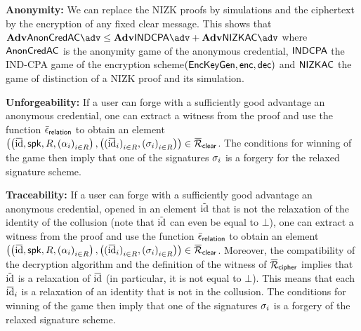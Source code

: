 \begin{compactitem} 
\item \textbf{Anonymity:} We can replace the NIZK 
proofs by simulations and the ciphertext by the encryption of any
	fixed clear message. This shows that
	$\Adv{\ProbAnomCredAC}{\adv} \leq \Adv{\ProbCPAEnc}{\adv} + 
\Adv{\ProbNIZKAC}{\adv}$
	where $\mathsf{AnonCredAC}$ is the anonymity game of the anonymous 
credential, $\textsf{INDCPA}$ the
	IND-CPA game of the encryption scheme\newline $(\mathsf{EncKeyGen}, \textsf{enc}, \textsf{dec})$ 
and $\mathsf{NIZKAC}$ the game of distinction of a NIZK proof and its 
simulation.

\item \textbf{Unforgeability:} If a user can forge with a sufficiently good 
advantage an anonymous
	credential, one can extract a witness from the proof and use the 
function
	$\bar{\epsilon}_{\mathsf{relation}}$ to obtain an element 
$\left(\left(\baridentity, \spk, R, {(\alpha_i)}_{i \in R}\right),
		      \left({(\baridentity_i)}_{i \in R}, 
{(\signature_i)}_{i \in R}\right)\right)
	      \in \barrelationclear$. The conditions for winning of the 
game then imply that one of
	      the signatures $\sigma_i$ is a forgery for the relaxed 
signature scheme.


      \item \textbf{Traceability:} If a user can forge with a sufficiently good 
advantage an anonymous credential, opened in an element 
$\tilde{\text{id}}$ that is not the relaxation of the identity of the 
collusion (note that $\tilde{\text{id}}$ can even be equal to 
$\bot$), one can extract a witness from the proof and use
the function
	$\bar{\epsilon}_{\mathsf{relation}}$ to obtain an element 
$\left(\left(\baridentity, \spk, R, {(\alpha_i)}_{i \in R}\right),
		      \left({(\baridentity_i)}_{i \in R}, 
{(\signature_i)}_{i \in R}\right)\right)
	      \in \barrelationclear$.  Moreover, the compatibility of 
the decryption algorithm and the definition of the witness of
	$\barrelationcipher$ implies that $\tilde{\text{id}}$ is a 
relaxation of $\baridentity$ (in particular, it is not equal to $\bot$).
	      This means that each $\baridentity_i$ is a relaxation of 
an identity that is not
	      in the collusion. The conditions for winning of the game then
imply that one of the
	      signatures $\sigma_i$ is a forgery of the relaxed 
signature scheme. \end{compactitem}


\iffalse
\begin{verbatim}
    _.~"(_.~"(_.~"(_.~"(_.~"(

    copier-coller depuis new_version_article le début de la section 4, avant 4.1 ?
copier-coller l'annexe K dans une annexe qui va sauter ?

Notes:

* Éric m'a parlé de l'annexe I page 55, mais pas la place ? 

Olivier: Mis le main... le reste bleh
\end{verbatim}
\fi
